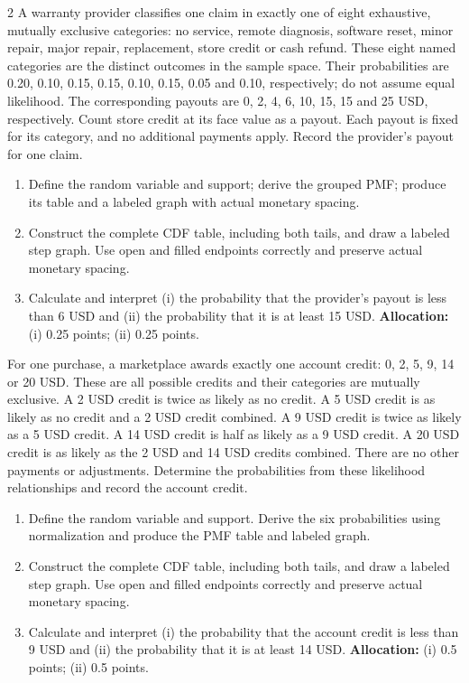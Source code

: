 \begin{multicols*}{2}
A warranty provider classifies one claim in exactly one of eight exhaustive, mutually exclusive categories: no service, remote diagnosis, software reset, minor repair, major repair, replacement, store credit or cash refund. These eight named categories are the distinct outcomes in the sample space. Their probabilities are 0.20, 0.10, 0.15, 0.15, 0.10, 0.15, 0.05 and 0.10, respectively; do not assume equal likelihood. The corresponding payouts are 0, 2, 4, 6, 10, 15, 15 and 25 USD, respectively. Count store credit at its face value as a payout. Each payout is fixed for its category, and no additional payments apply. Record the provider's payout for one claim.

\begin{enumerate}[label=(\alph*)]
\item Define the random variable and support; derive the grouped PMF; produce its table and a labeled graph with actual monetary spacing. 
\item Construct the complete CDF table, including both tails, and draw a labeled step graph. Use open and filled endpoints correctly and preserve actual monetary spacing. 
\item Calculate and interpret (i) the probability that the provider's payout is less than 6 USD and (ii) the probability that it is at least 15 USD. 
\textbf{Allocation:} (i) 0.25 points; (ii) 0.25 points.
\end{enumerate}

\columnbreak
{}
For one purchase, a marketplace awards exactly one account credit: 0, 2, 5, 9, 14 or 20 USD. These are all possible credits and their categories are mutually exclusive. A 2 USD credit is twice as likely as no credit. A 5 USD credit is as likely as no credit and a 2 USD credit combined. A 9 USD credit is twice as likely as a 5 USD credit. A 14 USD credit is half as likely as a 9 USD credit. A 20 USD credit is as likely as the 2 USD and 14 USD credits combined. There are no other payments or adjustments. Determine the probabilities from these likelihood relationships and record the account credit.

\begin{enumerate}[label=(\alph*)]
\item Define the random variable and support. Derive the six probabilities using normalization and produce the PMF table and labeled graph. 
\item Construct the complete CDF table, including both tails, and draw a labeled step graph. Use open and filled endpoints correctly and preserve actual monetary spacing. 
\item Calculate and interpret (i) the probability that the account credit is less than 9 USD and (ii) the probability that it is at least 14 USD. 
\textbf{Allocation:} (i) 0.5 points; (ii) 0.5 points.
\end{enumerate}


\end{multicols*}
